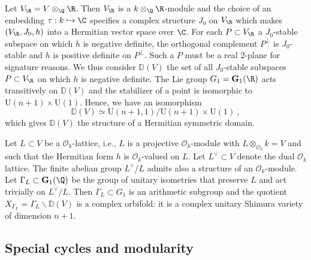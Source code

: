 \documentclass[11pt,letterpaper,english]{amsart}
\numberwithin{equation}{subsection}
\numberwithin{equation}{section}
\newcommand\cO{{\mathcal O}}
\newcommand\bD{{\mathbb D}}
\newcommand\bfG{{\mathbf G}}
\theoremstyle{plain}
\theoremstyle{remark}
\begin{document}
Let $V_\R=V\otimes_\Q \R$. Then $V_\R$ is a $k\otimes _\Q\R$-module and the choice of an embedding 
$\tau:k\hookrightarrow\C$ specifies a complex structure $J_0$ on $V_\R$ which makes $(V_\R,J_0,h)$ into a Hermitian vector space over $\C$. For each $P\subset V_\R$ a $J_0$-stable subspace on which $h$ is negative definite, the orthogonal complement $P^\bot$ is $J_0$-stable and $h$ is positive definite on $P^{\bot}$. Such a $P$ must be a real 2-plane for signature reasons. We thus consider $\bD(V)$ the set of all $J_0$-stable subspaces $P\subset V_\R$ on which $h$ is negative definite. The Lie group $G_1=\bfG_1(\R)$ acts transitively on $\bD(V)$ and the stabilizer of a point is isomorphic to $\mathrm{U}(n+1)\times \mathrm{U}(1)$. Hence, we have an isomorphism 
\[\bD(V)\simeq \mathrm{U}(n+1,1)/\mathrm{U}(n+1)\times \mathrm{U}(1)~,\]
which gives $\bD(V)$ the structure of a Hermitian symmetric domain. 


Let $L\subset V$ be a $\mathcal{O}_k$-lattice, i.e., $L$ is a projective $\cO_k$-module with $L\otimes_{\mathcal{O}_k}k=V$ and such that the Hermitian form $h$ is $\mathcal{O}_k$-valued on $L$. Let $L^{\vee}\subset V$ denote the dual $\mathcal{O}_k$ lattice. %
The finite abelian group $L^{\vee}/L$ admits also a structure of an $\mathcal{O}_k$-module. Let $\Gamma_L\subset \bfG_1(\Q)$ be the group of unitary isometries that preserve  $L$ and act trivially on $L^\vee/L$. Then $\Gamma_L\subset G_1$ is an arithmetic subgroup and the quotient $X_{\Gamma_L}=\Gamma_L\backslash \mathbb D(V)$ is a complex orbifold: it is a complex unitary Shimura variety of dimension $n+1$. 

\subsection{Special cycles and modularity}
\end{document}
